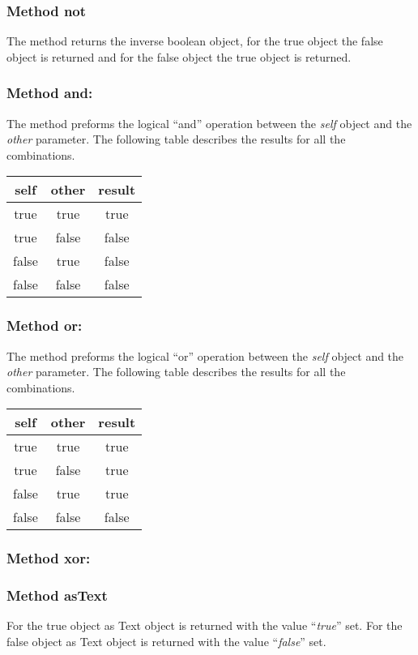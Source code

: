 \subsubsection{Method not}
The method returns the inverse boolean object, for the true object the false object is returned and for the false object the true object is returned.

\subsubsection{Method and:}
The method preforms the logical ``and'' operation between the \textit{self} object and the \textit{other} parameter. The following table describes the results for all the combinations.

\begin{center}
  \begin{tabular}{ | c | c | c | }
  	\hline
  	\textbf{self} & \textbf{other} & \textbf{result} \\ \hline
  	true          & true           & true            \\
  	true          & false          & false           \\
  	false         & true           & false           \\
  	false         & false          & false           \\ \hline
  \end{tabular}
\end{center}

\subsubsection{Method or:}
The method preforms the logical ``or'' operation between the \textit{self} object and the \textit{other} parameter. The following table describes the results for all the combinations.

\begin{center}
  \begin{tabular}{ | c | c | c | }
  	\hline
  	\textbf{self} & \textbf{other} & \textbf{result} \\ \hline
  	true          & true           & true            \\
  	true          & false          & true            \\
  	false         & true           & true            \\
  	false         & false          & false           \\ \hline
  \end{tabular}
\end{center}

\subsubsection{Method xor:}

\subsubsection{Method asText}
For the true object as Text object is returned with the value ``\textit{true}'' set. For the false object as Text object is returned with the value ``\textit{false}'' set.
